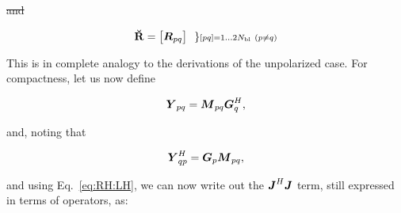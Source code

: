 \documentclass[useAMS,usenatbib]{mn2e}
\makeatletter
\newcommand{\mat}[1]{{\bmath{#1}}}
\newcommand{\JJ}{\mat{J}} %
\newcommand{\MM}{\mat{M}}
\newcommand{\GG}{\mat{G}}
\newcommand{\JHJ}{\JJ^H\JJ} %
\newcommand{\Matrix}[2]{\left [ \begin{array}{@{}#1@{}}#2\end{array} \right ]}
\newcommand{\AUGx}[1]{\mathbf{\breve{#1}}}
\newcommand{\RRr}{\AUGx{R}}
\newcommand{\Rop}[1]{\mathcal{R}_{{#1}}}
\newcommand{\Lop}[1]{\mathcal{L}_{{#1}}}
\numberwithin{equation}{section} %
\providecommand{\DIFadd}[1]{{\protect\color{blue}\uwave{#1}}} %
\providecommand{\DIFdel}[1]{{\protect\color{red}\sout{#1}}}                      %
\providecommand{\DIFaddbegin}{} %
\providecommand{\DIFaddend}{} %
\providecommand{\DIFdelbegin}{} %
\providecommand{\DIFdelend}{} %
\makeatother
\begin{document}
\DIFdel{and 
}%

\DIFdelend \DIFaddbegin \DIFadd{and 
}\DIFaddend \begin{equation}
\RRr = \Matrix{c}{ \mat{R}_{pq}}~~ 
\} \scriptstyle [pq]=1\dots 2\Nbl~(p\ne q)\\ 
\end{equation}
\DIFdelbegin %

\DIFdelend This is in complete analogy to the derivations of the unpolarized case. For compactness, let us now define
\DIFdelbegin %

\DIFdelend \newcommand{\YY}{\mat{Y}}
\newcommand{\ZZ}{\mat{Z}}
\DIFdelbegin %
\DIFdelend \DIFaddbegin \begin{equation}
\DIFaddend \YY_{pq} = \MM_{pq} \GG^H_q,
\DIFdelbegin %
\end{equation}%

\begin{equation}%
\DIFdelend \DIFaddbegin \end{equation}
\DIFaddend and, noting that 
\DIFdelbegin %

\DIFdelend \DIFaddbegin \begin{equation}
\DIFaddend \YY_{qp}^H = \GG_p \MM_{pq},
\DIFdelbegin %
\end{equation}%

\begin{equation}%
\DIFdelend \DIFaddbegin \end{equation}
\DIFaddend and using Eq.~\ref{eq:RH:LH}, we can now write out the $\JHJ$ term, still expressed in terms of 
operators, as:
\DIFdelbegin %
\end{document}
